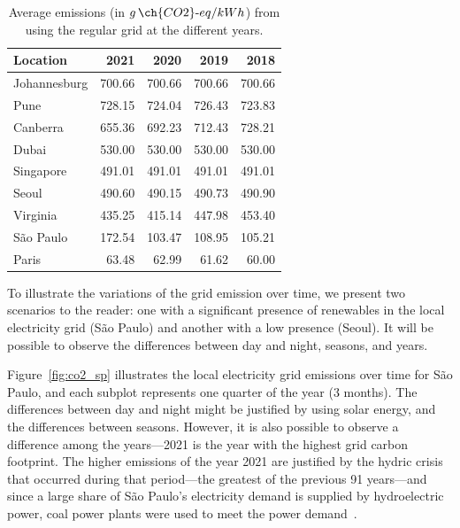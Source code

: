\begin{table}[h]
  \caption{Average emissions (in $g\,\ch{CO2}\text{-}eq/kWh$) from using the regular grid at the different years.}\label{tab:grid_emissions_avg_year} \centering
  \begin{tabular}{|l|r|r|r|r|}    
  \hline   
  \textbf{Location} &  \textbf{2021} & \textbf{2020} & \textbf{2019} & \textbf{2018}\\
  \hline
  Johannesburg & 700.66 & 700.66 & 700.66 & 700.66  \\
  \hline
  Pune & 728.15 & 724.04 & 726.43 & 723.83     \\
  \hline
  Canberra & 655.36 & 692.23 & 712.43 & 728.21\\
  \hline
  Dubai & 530.00  & 530.00 & 530.00 & 530.00     \\
  \hline
  Singapore & 491.01 & 491.01 & 491.01 & 491.01 \\
  \hline     
  Seoul & 490.60 & 490.15 & 490.73 & 490.90     \\
  \hline
  Virginia  & 435.25 & 415.14 & 447.98 & 453.40 \\
  \hline
  São Paulo &  172.54 &  103.47 & 108.95 &  105.21 \\
  \hline 
  Paris &  63.48  & 62.99 & 61.62   & 60.00   \\
  \hline

\end{tabular}  
\end{table}


To illustrate the variations of the grid emission over time, we present two scenarios to the reader: one with a significant presence of renewables in the local electricity grid (São Paulo) and another with a low presence (Seoul). It will be possible to observe the differences between day and night, seasons, and years.


Figure~\ref{fig:co2_sp} illustrates the local electricity grid emissions over time for São Paulo, and each subplot represents one quarter of the year (3 months). The differences between day and night might be justified by using solar energy, and the differences between seasons. However, it is also possible to observe a difference among the years---2021 is the year with the highest grid carbon footprint. The higher emissions of the year 2021 are justified by the hydric crisis that occurred during that period---the greatest of the previous 91 years---and since a large share of São Paulo's electricity demand is supplied by hydroelectric power, coal power plants were used to meet the power demand~\cite{CNN2021_crisehidrica}.

